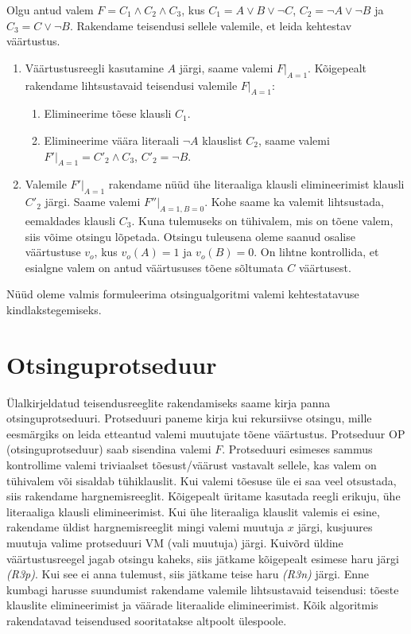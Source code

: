 \documentclass[12pt,estonian]{report}
\newcommand{\proc}[1]{\textsf{#1}}
\begin{document}
Olgu antud valem $F=C_{1}\wedge C_{2}\wedge C_{3}$, kus $C_{1}=A\vee B\vee\neg C$,
$C_{2}=\neg A\vee\neg B$ ja $C_{3}=C\vee\neg B$. Rakendame teisendusi
sellele valemile, et leida kehtestav väärtustus.

\begin{enumerate}
\item Väärtustusreegli kasutamine $A$ järgi, saame valemi $F|_{A=1}$.
Kõigepealt rakendame lihtsustavaid teisendusi valemile $F|_{A=1}$:

\begin{enumerate}
\item Elimineerime tõese klausli $C_{1}$.
\item Elimineerime väära literaali $\neg A$ klauslist $C_{2}$, saame valemi
$F'|_{A=1}={C'}_{2}\wedge C_{3}$, ${C'}_{2}=\neg B$.
\end{enumerate}
\item Valemile $F'|_{A=1}$ rakendame nüüd ühe literaaliga klausli elimineerimist
klausli $C'_{2}$ järgi. Saame valemi $F''|_{A=1,B=0}$. Kohe saame
ka valemit lihtsustada, eemaldades klausli $C_{3}.$ Kuna tulemuseks
on tühivalem, mis on tõene valem, siis võime otsingu lõpetada. Otsingu
tuleusena oleme saanud osalise väärtustuse $v_{o}$, kus $v_{o}(A)=1$
ja $v_{o}(B)=0$. On lihtne kontrollida, et esialgne valem on antud
väärtususes tõene sõltumata $C$ väärtusest.
\end{enumerate}
Nüüd oleme valmis formuleerima otsingualgoritmi valemi kehtestatavuse
kindlakstegemiseks.


\section{Otsinguprotseduur}

Ülalkirjeldatud teisendusreeglite rakendamiseks saame kirja panna
otsinguprotseduuri. Protseduuri paneme kirja kui rekursiivse otsingu,
mille eesmärgiks on leida etteantud valemi muutujate tõene väärtustus.
Protseduur \proc{OP} (otsinguprotseduur) saab sisendina valemi $F$.
Protseduuri esimeses sammus kontrollime valemi triviaalset tõesust/väärust
vastavalt sellele, kas valem on tühivalem või sisaldab tühiklauslit.
Kui valemi tõesuse üle ei saa veel otsustada, siis rakendame hargnemisreeglit.
Kõigepealt üritame kasutada reegli erikuju, ühe literaaliga klausli
elimineerimist. Kui ühe literaaliga klauslit valemis ei esine, rakendame
üldist hargnemisreeglit mingi valemi muutuja $x$ järgi, kusjuures
muutuja valime protseduuri \proc{VM} (vali muutuja) järgi. Kuivõrd
üldine väärtustusreegel jagab otsingu kaheks, siis jätkame kõigepealt
esimese haru järgi \emph{(R3p)}. Kui see ei anna tulemust, siis jätkame teise haru \emph{(R3n)}
järgi. Enne kumbagi harusse suundumist rakendame valemile lihtsustavaid
teisendusi: tõeste klauslite elimineerimist ja väärade literaalide
elimineerimist. Kõik algoritmis rakendatavad teisendused sooritatakse
altpoolt ülespoole.
\end{document}
